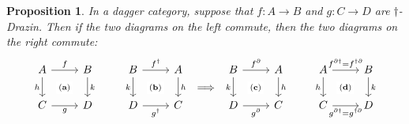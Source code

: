 \documentclass[submission,copyright,creativecommons]{eptcs}
\newtheorem{proposition}[observation]{Proposition}
\begin{document}
\begin{proposition}\label{dagger-Drazin-commuting} In a dagger category, suppose that $f: A \to B$ and $g: C \to D$ are $\dagger$-Drazin. Then if the two diagrams on the left commute, then the two diagrams on the right commute: 
\vspace{-0.3cm}
\[ \begin{array}[c]{c} \begin{tikzcd}
	A & B & B & A \\
	C & D & D & C
    	\arrow["{(\textbf{a})}"{description}, draw=none, from=1-1, to=2-2]
        \arrow["{(\textbf{b})}"{description}, draw=none, from=1-3, to=2-4]
	\arrow["f", from=1-1, to=1-2]
	\arrow["h"', from=1-1, to=2-1]
	\arrow["k", from=1-2, to=2-2]
	\arrow["{f^\dagger}", from=1-3, to=1-4]
	\arrow["k"', from=1-3, to=2-3]
	\arrow["h", from=1-4, to=2-4]
	\arrow["g"', from=2-1, to=2-2]
	\arrow["{g^\dagger}"', from=2-3, to=2-4]
\end{tikzcd} \end{array} \Longrightarrow \begin{array}[c]{c} \begin{tikzcd}
	B & A & A & B \\
	D & C & C & D
    \arrow["{(\textbf{c})}"{description}, draw=none, from=1-1, to=2-2]
        \arrow["{(\textbf{d})}"{description}, draw=none, from=1-3, to=2-4]
	\arrow["{f^\partial}", from=1-1, to=1-2]
	\arrow["k"', from=1-1, to=2-1]
	\arrow["h", from=1-2, to=2-2]
	\arrow["{f^{\partial\dagger}= f^{\dagger\partial}}", from=1-3, to=1-4]
	\arrow["h"', from=1-3, to=2-3]
	\arrow["k", from=1-4, to=2-4]
	\arrow["{g^\partial}"', from=2-1, to=2-2]
	\arrow["{g^{\partial\dagger}= g^{\dagger\partial}}"', from=2-3, to=2-4]
\end{tikzcd} \end{array} \]
\vspace{-0.5cm}
\end{proposition}
\end{document}
